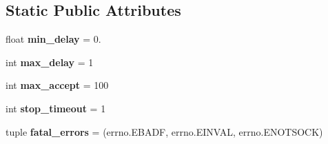 \subsection*{Static Public Attributes}
\begin{DoxyCompactItemize}
\item 
\mbox{\label{classgevent_1_1baseserver_1_1_base_server_a45100de0bf48361955321e60cc148678}} 
float {\bfseries min\+\_\+delay} = 0.
\item 
\mbox{\label{classgevent_1_1baseserver_1_1_base_server_ab4694a7ae406118e504300473371033b}} 
int {\bfseries max\+\_\+delay} = 1
\item 
\mbox{\label{classgevent_1_1baseserver_1_1_base_server_ab718ee4ec1365575ac599503a64c7a1e}} 
int {\bfseries max\+\_\+accept} = 100
\item 
\mbox{\label{classgevent_1_1baseserver_1_1_base_server_adc18f143ce4877af015159e85b8f6d9c}} 
int {\bfseries stop\+\_\+timeout} = 1
\item 
\mbox{\label{classgevent_1_1baseserver_1_1_base_server_a914bde23099f6eee2e49af46f6b8348f}} 
tuple {\bfseries fatal\+\_\+errors} = (errno.\+E\+B\+A\+DF, errno.\+E\+I\+N\+V\+AL, errno.\+E\+N\+O\+T\+S\+O\+CK)
\end{DoxyCompactItemize}


